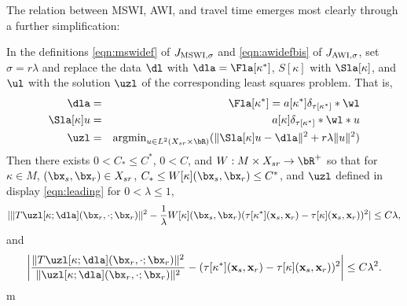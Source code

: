 The relation between MSWI, AWI, and travel time emerges most clearly
through a further simplification:

\begin{prop}
  \label{thm:leading}
In the definitions \ref{eqn:mswidef} of $J_{\rm MSWI,\sigma}$ and
\ref{eqn:awidefbis} of $J_{\rm AWI,\sigma}$, set $\sigma = r\lambda$
and replace the data $\dl$ with
$\dla = \Fla[\kappa^*]$, $S[\kappa]$ with $\Sla[\kappa]$, and $\ul$
with the solution $\uzl$ of the corresponding least squares problem. That is,
\begin{eqnarray}
  \label{eqn:leading}
  \dla & = & \Fla[\kappa^*] = a[\kappa^*]\delta_{\tau[\kappa^*]}*\wl
             \nonumber \\
  \Sla[\kappa]u &=& a[\kappa]\delta_{\tau[\kappa^*]}*\wl *u\nonumber
  \\
  \uzl &=& \mbox{argmin}_{u \in L^2(X_{sr} \times \bR)} (\|\Sla[\kappa]u-\dla\|^2 + r\lambda\|u\|^2)
\end{eqnarray}
Then there exists $0 < C_* \le C^*$, $0 < C$, and $W: M \times X_{sr}
\rightarrow \bR^+$ so that for
$\kappa \in M$, $(\bx_s,\bx_r) \in X_{sr}$, $C_* \le
W[\kappa](\bx_s,\bx_r) \le C^*$, and $\uzl$ defined in display
\ref{eqn:leading} for $0 < \lambda \le 1$, 
\begin{equation}
  \label{eqn:mswittz}
 | \|T\uzl[\kappa;\dla] (\bx_r,\cdot;\bx_r)\|^2- 
  \frac{1}{\lambda} W[\kappa](\bx_s,\bx_r) (\tau[\kappa^*]({\bf
  x}_s,{\bf x}_r)-\tau[\kappa]({\bf x}_s,{\bf x}_r))^2 | \le C\lambda,
\end{equation}
and
\begin{equation}
  \label{eqn:awittz}
  \left| \frac{\|T\uzl[\kappa;\dla] (\bx_r,\cdot;\bx_r)\|^2}{
        \|\uzl[\kappa;\dla] (\bx_r,\cdot;\bx_r)\|^2} - (\tau[\kappa^*]({\bf
  x}_s,{\bf x}_r)-\tau[\kappa]({\bf x}_s,{\bf x}_r))^2\right|  \le C\lambda^2.
\end{equation}
m\end{prop}

